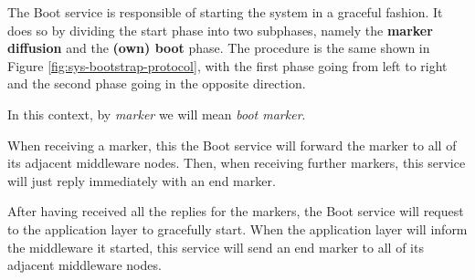 \label{sec:mw-boot-descr}

The Boot service is responsible of starting the system in a graceful fashion.
It does so by dividing the start phase into two subphases, namely the
\textbf{marker diffusion} and the \textbf{(own) boot} phase. The procedure is
the same shown in Figure \ref{fig:sys-bootstrap-protocol}, with the first phase
going from left to right and the second phase going in the opposite direction.

In this context, by \textit{marker} we will mean \textit{boot marker}.

When receiving a marker, this the Boot service will forward the marker to all
of its adjacent middleware nodes.
Then, when receiving further markers, this service will just reply immediately
with an end marker.

After having received all the replies for the markers, the Boot service will
request to the application layer to gracefully start.
When the application layer will inform the middleware it started, this service
will send an end marker to all of its adjacent middleware nodes.

